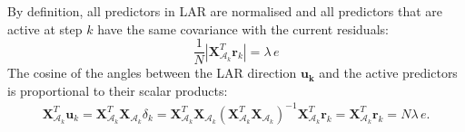 

By definition, all predictors in LAR are normalised and all predictors
that are active at step $k$ have the same covariance with the
current residuals:
$$
\frac{1}{N}|\mathbf{X}_{\mathcal{A}_k}^T \mathbf{r}_k| = \lambda\, e
$$
The cosine of the angles between the LAR direction $\mathbf{u_k}$
and the active predictors is proportional to their scalar products:
\begin{eqnarray*}
    \mathbf{X}_{\mathcal{A}_k}^T \mathbf{u}_k  = 
    \mathbf{X}_{\mathcal{A}_k}^T \mathbf{X}_{\mathcal{A}_k} \delta_k =  \mathbf{X}_{\mathcal{A}_k}^T \mathbf{X}_{\mathcal{A}_k} 
    (\mathbf{X}_{\mathcal{A}_k}^T \mathbf{X}_{\mathcal{A}_k} )^{-1}
    \mathbf{X}_{\mathcal{A}_k}^T \mathbf{r}_k = 
    \mathbf{X}_{\mathcal{A}_k}^T \mathbf{r}_k = N \lambda \, e.
\end{eqnarray*}

